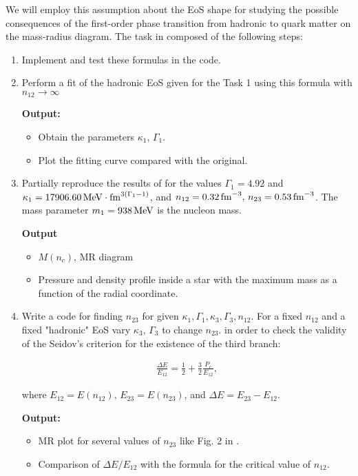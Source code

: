 \documentclass[12pt]{article}
\begin{document}
We will employ this assumption about the EoS shape for studying the possible consequences of the first-order phase transition from hadronic to quark matter on the mass-radius diagram. The task in composed of the following steps:

\begin{enumerate}
	\item Implement and test these formulas in the code. 
	
	\item Perform a fit of the hadronic EoS given for the Task 1 using this formula with $n_{12} \to \infty$
	
	{\bf Output:}
	
	\begin{itemize}
		\item Obtain the parameters $\kappa_1, \, \Gamma_1$.
		\item Plot the fitting curve compared with the original.
	\end{itemize}

	
	\item Partially reproduce the results of \cite{Alvarez-Castillo:2017qki} for the values $\Gamma_1 = 4.92$ and $\kappa_1 = 17906.60 \, {\rm MeV} \cdot {\rm fm}^{3 (\Gamma_1 - 1) }$, and $n_{12} = 0.32 \, {\rm fm}^{-3}, \, n_{23} = 0.53 \, {\rm fm}^{-3}$. The mass parameter $m_1 = 938 \, {\rm MeV}$ is the nucleon mass. 
	
	{\bf Output}
	\begin{itemize}
		\item $M(n_c)$, MR diagram
		\item Pressure and density profile inside a star with the maximum mass as a function of the radial coordinate.
	\end{itemize}
	
	\item Write a code for finding $n_{23}$ for given $\kappa_1, \Gamma_1, \kappa_3, \Gamma_3, n_{12}$. For a fixed $n_{12}$ and a fixed "hadronic" EoS vary $\kappa_3, \, \Gamma_3$ to change $n_{23}$.  in order to check the validity of the Seidov's criterion \cite{seidov} for the existence of the third branch:
	
	\begin{eqnarray}
		\frac{\Delta E}{E_{12}} = \frac{1}{2} + \frac{3}{2} \frac{P_c}{E_{12}},
	\end{eqnarray}
	
	where $E_{12} = E(n_{12}), \, E_{23} = E(n_{23})$, and  $\Delta E = E_{23} - E_{12}$.
	
	
	{\bf Output:}
	\begin{itemize}
		\item MR plot for several values of $n_{23}$ like Fig. 2 in \cite{Lindblom:1998dp}.
		\item Comparison of $\Delta E / E_{12}$ with the formula for the critical value of $n_{12}$.
	\end{itemize}
\end{enumerate}
\end{document}
